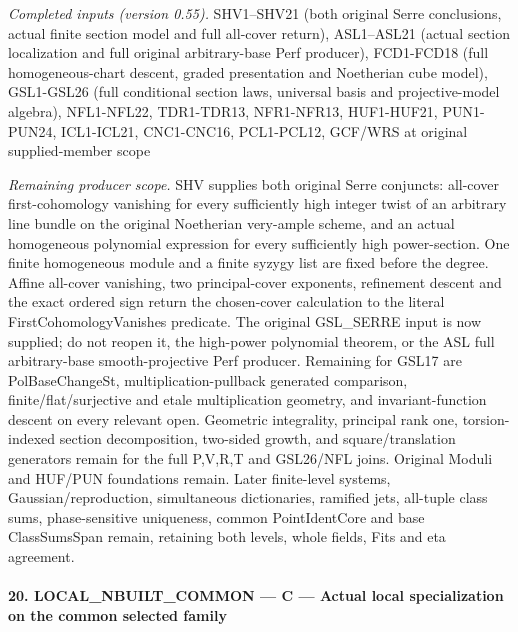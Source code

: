 \documentclass[11pt,a4paper]{article}
\numberwithin{equation}{section}
\theoremstyle{remark}\newtheorem{remark}[theorem]{Remark}
\begin{document}
\emph{Completed inputs (version 0.55).} SHV1–SHV21 (both original Serre conclusions, actual finite section model and full all-cover return), ASL1–ASL21 (actual section localization and full original arbitrary-base Perf producer), FCD1-FCD18 (full homogeneous-chart descent, graded presentation and Noetherian cube model), GSL1-GSL26 (full conditional section laws, universal basis and projective-model algebra), NFL1-NFL22, TDR1-TDR13, NFR1-NFR13, HUF1-HUF21, PUN1-PUN24, ICL1-ICL21, CNC1-CNC16, PCL1-PCL12, GCF/WRS at original supplied-member scope

\emph{Remaining producer scope.} SHV supplies both original Serre conjuncts: all-cover first-cohomology vanishing for every sufficiently high integer twist of an arbitrary line bundle on the original Noetherian very-ample scheme, and an actual homogeneous polynomial expression for every sufficiently high power-section. One finite homogeneous module and a finite syzygy list are fixed before the degree. Affine all-cover vanishing, two principal-cover exponents, refinement descent and the exact ordered sign return the chosen-cover calculation to the literal FirstCohomologyVanishes predicate. The original GSL\_\allowbreak SERRE input is now supplied; do not reopen it, the high-power polynomial theorem, or the ASL full arbitrary-base smooth-projective Perf producer. Remaining for GSL17 are PolBaseChangeSt, multiplication-pullback generated comparison, finite/flat/surjective and etale multiplication geometry, and invariant-function descent on every relevant open. Geometric integrality, principal rank one, torsion-indexed section decomposition, two-sided growth, and square/translation generators remain for the full P,V,R,T and GSL26/NFL joins. Original Moduli and HUF/PUN foundations remain. Later finite-level systems, Gaussian/reproduction, simultaneous dictionaries, ramified jets, all-tuple class sums, phase-sensitive uniqueness, common PointIdentCore and base ClassSumsSpan remain, retaining both levels, whole fields, Fits and eta agreement.



\paragraph{20. LOCAL\_\allowbreak NBUILT\_\allowbreak COMMON — C — Actual local specialization on the common selected family}
\end{document}
